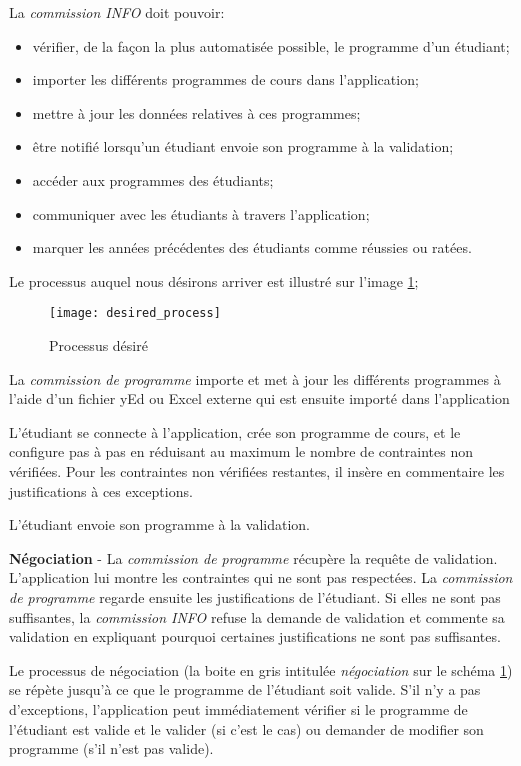 La \textit{commission INFO} doit pouvoir:
\begin{itemize}
\item vérifier, de la façon la plus automatisée possible, le programme d'un étudiant;
\item importer les différents programmes de cours dans l'application;
\item mettre à jour les données relatives à ces programmes;
\item être notifié lorsqu'un étudiant envoie son programme à la validation;
\item accéder aux programmes des étudiants;
\item communiquer avec les étudiants à travers l'application;
\item marquer les années précédentes des étudiants comme réussies ou ratées.
\end{itemize}

Le processus auquel nous désirons arriver est illustré sur l'image \ref{fig:desired_process};

\begin{figure}
\centering
\caption{Processus désiré}
\label{fig:desired_process}
\texttt{[image: desired\_process]}
\end{figure}


La \textit{commission de programme} importe et met à jour les différents programmes à l'aide d'un fichier yEd ou Excel externe qui est ensuite importé dans l'application

L'étudiant se connecte à l'application, crée son programme de cours, et le configure pas à pas en réduisant au maximum le nombre de contraintes non vérifiées. Pour les contraintes non vérifiées restantes, il insère en commentaire les justifications à ces exceptions. 

L'étudiant envoie son programme à la validation. 

\textbf{Négociation} - La \textit{commission de programme} récupère la requête de validation. L'application lui montre les contraintes qui ne sont pas respectées. La \textit{commission de programme} regarde ensuite les justifications de l'étudiant. Si elles ne sont pas suffisantes, la \textit{commission INFO} refuse la demande de validation et commente sa validation en expliquant pourquoi certaines justifications ne sont pas suffisantes. 

Le processus de négociation (la boite en gris intitulée \textit{négociation} sur le schéma \ref{fig:desired_process}) se répète jusqu'à ce que le programme de l'étudiant soit valide. S'il n'y a pas d'exceptions, l'application peut immédiatement vérifier si le programme de l'étudiant est valide et le valider (si c'est le cas) ou demander de modifier son programme (s'il n'est pas valide).





